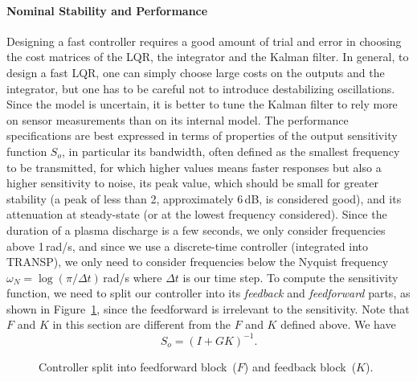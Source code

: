 \documentclass[12pt,lot, lof]{puthesis}
\begin{document}
\paragraph{Nominal Stability and Performance}

Designing a fast controller requires a good amount of trial and error in choosing the cost matrices of the LQR, the integrator and the Kalman filter.
In general, to design a fast LQR, one can simply choose large costs on the outputs and the integrator, but one has to be careful not to introduce destabilizing oscillations.
Since the model is uncertain, it is better to tune the Kalman filter to rely more on sensor measurements than on its internal model.
The performance specifications are best expressed in terms of properties of the output sensitivity function $S_o$, in particular
its bandwidth, often defined as the smallest frequency to be transmitted, for which higher values means faster responses but also a higher sensitivity to noise,
its peak value, which should be small for greater stability (a peak of  less than 2, approximately 6\,dB, is considered good),
and its attenuation at steady-state (or at the lowest frequency considered).
Since the duration of a plasma discharge is a few seconds, we only consider frequencies above 1\,rad/s,
and since we use a discrete-time controller (integrated into TRANSP), we only need to consider frequencies below the Nyquist frequency $\omega_N = \log(\pi/\Delta t)$\,rad/s where $\Delta t$ is our time step.
To compute the sensitivity function, we need to split our controller into its \emph{feedback} and \emph{feedforward} parts, as shown in Figure~\ref{fig:split_controller}, since the feedforward is irrelevant to the sensitivity. Note that $F$ and $K$ in this section are different from the $F$ and $K$ defined above.
We have
\begin{equation}
	S_o = (I + G K)^{-1}.
\end{equation}

\begin{figure}[htbp]
	\centering
	\caption{Controller split into feedforward block~($F$) and feedback block~($K$).}
	\label{fig:split_controller}
\end{figure}
\end{document}
